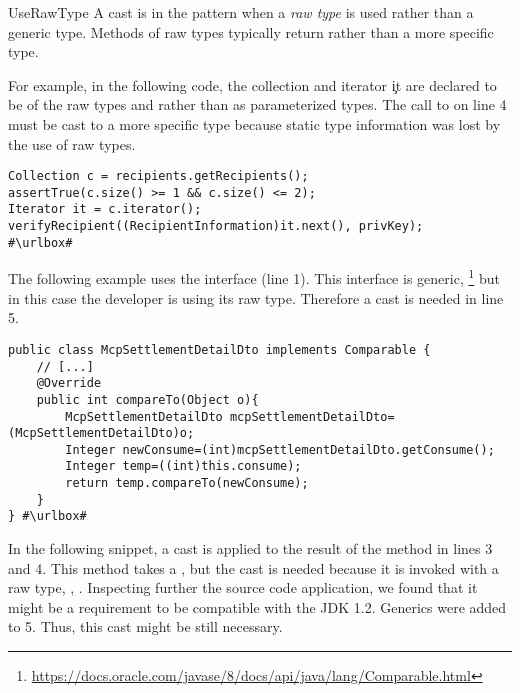 \begin{pattern}{UseRawType}
A cast is in the \thisp{} pattern when a \emph{raw type} is used rather than a generic type.
Methods of raw types typically return  rather than a more specific type.

\instances{}
For example, in the following code,
the collection  and iterator \c{it} are declared to be of the raw types  and  rather than as parameterized types.
The call to  on line 4 must be cast to a more specific type because static type information was lost by the use of raw types.

\def\urlvar{http://bit.ly/bcgit_bc_java_2SD2HLm}
\begin{verbatim}
Collection c = recipients.getRecipients();
assertTrue(c.size() >= 1 && c.size() <= 2);
Iterator it = c.iterator();
verifyRecipient((RecipientInformation)it.next(), privKey);
#\urlbox#
\end{verbatim}

The following example uses the  interface (line 1).
This interface is generic,%
\footnote{\url{https://docs.oracle.com/javase/8/docs/api/java/lang/Comparable.html}}
but in this case the developer is using its raw type.
Therefore a cast is needed in line 5.

\def\urlvar{http://bit.ly/fangjie008_tiexue_mcp_parent_2FSZKzm}
\begin{verbatim}
public class McpSettlementDetailDto implements Comparable {
    // [...]
    @Override
    public int compareTo(Object o){
        McpSettlementDetailDto mcpSettlementDetailDto=(McpSettlementDetailDto)o;
        Integer newConsume=(int)mcpSettlementDetailDto.getConsume();
        Integer temp=((int)this.consume);
        return temp.compareTo(newConsume);
    }
} #\urlbox#
\end{verbatim}


In the following snippet,
a cast is applied to the result of the  method in lines 3 and 4.
This method takes a ,
but the cast is needed because it is invoked with a raw type, \eg, .
Inspecting further the source code application,
we found that it might be a requirement to be compatible with the JDK 1.2.
Generics were added to \java{} 5.
Thus, this cast might be still necessary.


\end{pattern}
